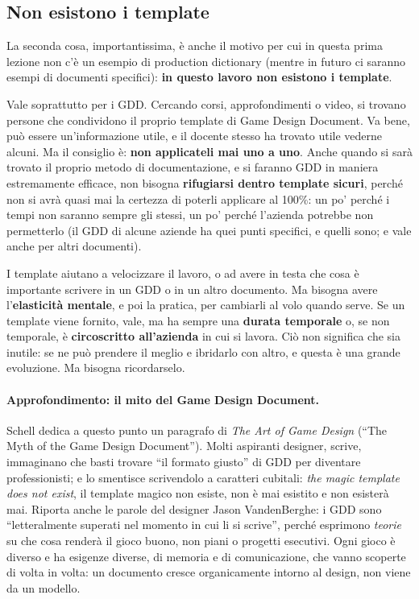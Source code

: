 \subsection{Non esistono i template}

La seconda cosa, importantissima, è anche il motivo per cui in questa prima
lezione non c'è un esempio di production dictionary (mentre in futuro ci
saranno esempi di documenti specifici): \textbf{in questo lavoro non esistono
i template}.

Vale soprattutto per i GDD. Cercando corsi, approfondimenti o video, si
trovano persone che condividono il proprio template di Game Design Document.
Va bene, può essere un'informazione utile, e il docente stesso ha trovato
utile vederne alcuni. Ma il consiglio è: \textbf{non applicateli mai uno a
uno}. Anche quando si sarà trovato il proprio metodo di documentazione, e si
faranno GDD in maniera estremamente efficace, non bisogna \textbf{rifugiarsi
dentro template sicuri}, perché non si avrà quasi mai la certezza di poterli
applicare al 100\%: un po' perché i tempi non saranno sempre gli stessi, un
po' perché l'azienda potrebbe non permetterlo (il GDD di alcune aziende ha
quei punti specifici, e quelli sono; e vale anche per altri documenti).

I template aiutano a velocizzare il lavoro, o ad avere in testa che cosa è
importante scrivere in un GDD o in un altro documento. Ma bisogna avere
l'\textbf{elasticità mentale}, e poi la pratica, per cambiarli al volo quando
serve. Se un template viene fornito, vale, ma ha sempre una \textbf{durata
temporale} o, se non temporale, è \textbf{circoscritto all'azienda} in cui si
lavora. Ciò non significa che sia inutile: se ne può prendere il meglio e
ibridarlo con altro, e questa è una grande evoluzione. Ma bisogna
ricordarselo.

\paragraph{Approfondimento: il mito del Game Design Document.} Schell dedica
a questo punto un paragrafo di \emph{The Art of Game Design} (``The Myth of
the Game Design Document''). Molti aspiranti designer, scrive, immaginano che
basti trovare ``il formato giusto'' di GDD per diventare professionisti; e lo
smentisce scrivendolo a caratteri cubitali: \emph{the magic template does not
exist}, il template magico non esiste, non è mai esistito e non esisterà mai.
Riporta anche le parole del designer Jason VandenBerghe: i GDD sono
``letteralmente superati nel momento in cui li si scrive'', perché esprimono
\emph{teorie} su che cosa renderà il gioco buono, non piani o progetti
esecutivi. Ogni gioco è diverso e ha esigenze diverse, di memoria e di
comunicazione, che vanno scoperte di volta in volta: un documento cresce
organicamente intorno al design, non viene da un modello.


